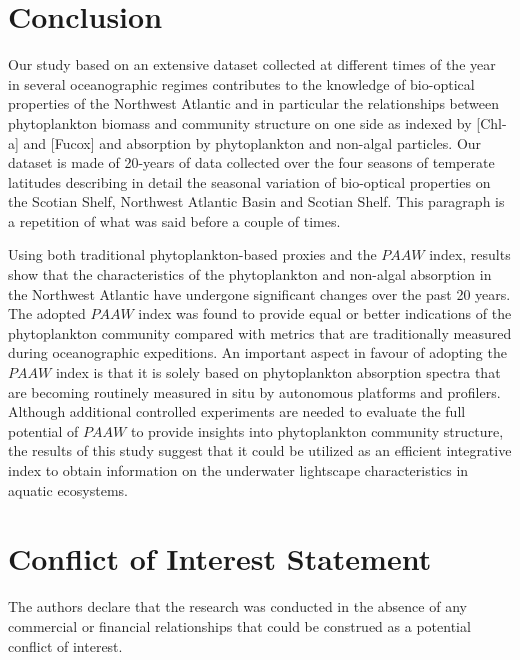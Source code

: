 \documentclass[utf8]{frontiersSCNS} %
\begin{document}
\section{Conclusion}

Our study based on an extensive dataset collected at different times of the year in several oceanographic regimes contributes to the knowledge of bio-optical properties of the Northwest Atlantic and in particular the relationships between phytoplankton biomass and community structure on one side as indexed by [Chl-a] and [Fucox] and absorption by phytoplankton and non-algal particles. Our dataset is made of 20-years of data collected over the four seasons of temperate latitudes describing in detail the seasonal variation of bio-optical properties on the Scotian Shelf, Northwest Atlantic Basin and Scotian Shelf. This paragraph is a repetition of what was said before a couple of times.

Using both traditional phytoplankton-based proxies and the $PAAW$ index, results show that the characteristics of the phytoplankton and non-algal absorption in the Northwest Atlantic have undergone significant changes over the past 20 years. The adopted $PAAW$ index was found to provide equal or better indications of the phytoplankton community compared with metrics that are traditionally measured during oceanographic expeditions. An important aspect in favour of adopting the $PAAW$ index is that it is solely based on phytoplankton absorption spectra that are becoming routinely measured in situ by autonomous platforms and profilers. Although additional controlled experiments are needed to evaluate the full potential of $PAAW$ to provide insights into phytoplankton community structure, the results of this study suggest that it could be utilized as an efficient integrative index to obtain information on the underwater lightscape characteristics in aquatic ecosystems.


\section*{Conflict of Interest Statement}

The authors declare that the research was conducted in the absence of any commercial or financial relationships that could be construed as a potential conflict of interest.
\end{document}
